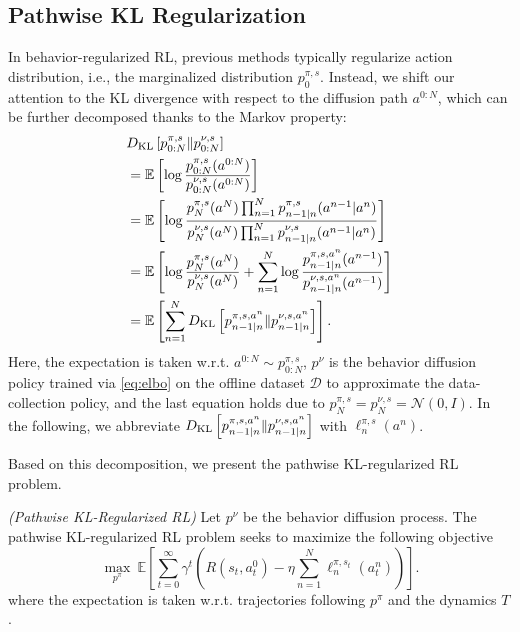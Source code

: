 \subsection{Pathwise KL Regularization}\label{sec:pathwise_kl}

In behavior-regularized RL, previous methods typically regularize action distribution, i.e., the marginalized distribution $p^{\pi, s}_{0}$. Instead, we shift our attention to the KL divergence with respect to the diffusion path $a^{0:N}$, which can be further decomposed thanks to the Markov property: 
\begin{equation}\label{eq:pathwise_kl}
    \begin{aligned}
        &D_{\rm KL}\left[p^{\pi, s}_{0:N}\|p^{\nu, s}_{0:N}\right]\\
        &=\mathbb{E}\left[\log\frac{p^{\pi, s}_{0:N}(a^{0:N})}{p^{\nu, s}_{0:N}(a^{0:N})}\right]\\
        &=\mathbb{E}\left[\log \frac{p_N^{\pi,s}(a^N)\prod_{n=1}^Np_{n-1|n}^{\pi,s}(a^{n-1}|a^n)}{p_N^{\nu,s}(a^N)\prod_{n=1}^Np_{n-1|n}^{\nu,s}(a^{n-1}|a^n)}\right]\\
        &=\mathbb{E}\left[\log \frac{p^{\pi, s}_{N}(a^{N})}{p^{\nu, s}_{N}(a^{N})}+\sum_{n=1}^{N}\log\frac{p^{\pi, s,a^n}_{n-1|n}(a^{n-1})}{p^{\nu, s,a^n}_{n-1|n}(a^{n-1})}\right]\\
        &=\mathbb{E}\left[\sum_{n=1}^{N}D_{\rm KL}\left[p^{\pi, s,a^n}_{n-1|n}\|p^{\nu, s,a^n}_{n-1|n}\right]\right]. 
    \end{aligned}
\end{equation}
Here, the expectation is taken w.r.t. $a^{0:N}\sim p^{\pi, s}_{0:N}$, $p^{\nu}$ is the behavior diffusion policy trained via \eqref{eq:elbo} on the offline dataset $\mathcal{D}$ to approximate the data-collection policy, and the last equation holds due to $p_N^{\pi,s}=p_{N}^{\nu,s}=\mathcal{N}(0, I)$. In the following, we abbreviate $D_{\rm KL}\left[p^{\pi, s,a^n}_{n-1|n}\|p^{\nu, s,a^n}_{n-1|n}\right]$ with $\ell^{\pi,s}_{n}(a^n)$.

Based on this decomposition, we present the pathwise KL-regularized RL problem.
\begin{definition}\label{problem:pathwise_kl_brl}
    \textit{(Pathwise KL-Regularized RL)} Let $p^{\nu}$ be the behavior diffusion process. The pathwise KL-regularized RL problem seeks to maximize the following objective
    \begin{equation}
    \label{eq:pathwise_kl_obj}
        \max_{p^\pi}\  \mathbb{E}\left[\sum_{t=0}^\infty \gamma^t\left(R(s_t,a_t^0)-\eta\sum_{n=1}^N\ell_{n}^{\pi,s_t}(a_t^n)\right)\right].
    \end{equation}
where the expectation is taken w.r.t. trajectories following $p^\pi$ and the dynamics $T$.
\end{definition}

